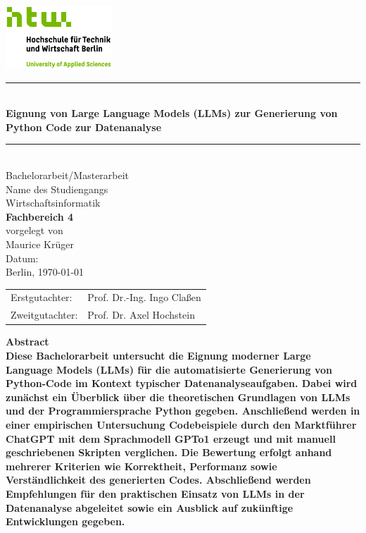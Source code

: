 \documentclass[11pt,a4paper]{article}
\begin{document}
\begin{titlepage}
    \centering
    
    \includegraphics[width=4cm]{./bilder/S04_HTW_Berlin_Logo_pos_FARBIG_RGB.jpg}\\[1.0cm]
    \rule{\linewidth}{0.5pt}\\[0.7cm]
    
    {\color{htwgreen}\bfseries\Large Eignung von Large Language Models (LLMs) zur Generierung von Python Code zur
    Datenanalyse}\\[0.5cm]
    \rule{\linewidth}{0.5pt}\\[2.0cm]
    {\large Bachelorarbeit/Masterarbeit}\\[1.5cm]
    
    {\large Name des Studiengangs}\\
    {\LARGE Wirtschaftsinformatik}\\[0.3cm]
    {\color{htwgreen}\LARGE \textbf{Fachbereich 4}}\\[1.5cm]
    
    {vorgelegt von}\\
    {\LARGE Maurice Krüger}\\[3cm]
    
    {\Large Datum:}\\
    Berlin, \today\\[2.5cm]

    {\LARGE
    \begin{tabular}{l l}
        Erstgutachter:  & Prof. Dr.-Ing. Ingo Claßen \\
        Zweitgutachter: & Prof. Dr. Axel Hochstein \\
    \end{tabular}
    }

\end{titlepage}

\textbf{
    Abstract\\
    Diese Bachelorarbeit untersucht die Eignung moderner Large Language Models (LLMs) für die automatisierte Generierung von Python-Code im Kontext typischer Datenanalyseaufgaben. Dabei wird zunächst ein Überblick über die theoretischen Grundlagen von LLMs und der Programmiersprache Python gegeben. Anschließend werden in einer empirischen Untersuchung Codebeispiele durch den Marktführer ChatGPT mit dem Sprachmodell GPTo1 erzeugt und mit manuell geschriebenen Skripten verglichen. Die Bewertung erfolgt anhand mehrerer Kriterien wie Korrektheit, Performanz sowie Verständlichkeit des generierten Codes. Abschließend werden Empfehlungen für den praktischen Einsatz von LLMs in der Datenanalyse abgeleitet sowie ein Ausblick auf zukünftige Entwicklungen gegeben.
}
\newpage
\end{document}

